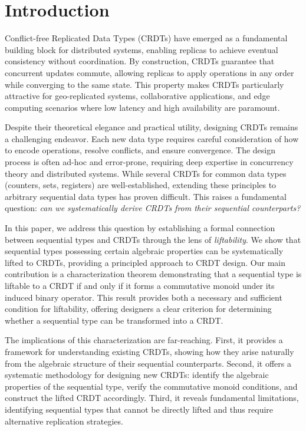 \section{Introduction}\label{sec:introduction}

Conflict-free Replicated Data Types (CRDTs) have emerged as a fundamental building block for distributed systems, enabling replicas to achieve eventual consistency without coordination. By construction, CRDTs guarantee that concurrent updates commute, allowing replicas to apply operations in any order while converging to the same state. This property makes CRDTs particularly attractive for geo-replicated systems, collaborative applications, and edge computing scenarios where low latency and high availability are paramount.

Despite their theoretical elegance and practical utility, designing CRDTs remains a challenging endeavor. Each new data type requires careful consideration of how to encode operations, resolve conflicts, and ensure convergence. The design process is often ad-hoc and error-prone, requiring deep expertise in concurrency theory and distributed systems. While several CRDTs for common data types (counters, sets, registers) are well-established, extending these principles to arbitrary sequential data types has proven difficult. This raises a fundamental question: \emph{can we systematically derive CRDTs from their sequential counterparts?}

In this paper, we address this question by establishing a formal connection between sequential types and CRDTs through the lens of \emph{liftability}. We show that sequential types possessing certain algebraic properties can be systematically lifted to CRDTs, providing a principled approach to CRDT design. Our main contribution is a characterization theorem demonstrating that a sequential type is liftable to a CRDT if and only if it forms a commutative monoid under its induced binary operator. This result provides both a necessary and sufficient condition for liftability, offering designers a clear criterion for determining whether a sequential type can be transformed into a CRDT.

The implications of this characterization are far-reaching. First, it provides a framework for understanding existing CRDTs, showing how they arise naturally from the algebraic structure of their sequential counterparts. Second, it offers a systematic methodology for designing new CRDTs: identify the algebraic properties of the sequential type, verify the commutative monoid conditions, and construct the lifted CRDT accordingly. Third, it reveals fundamental limitations, identifying sequential types that cannot be directly lifted and thus require alternative replication strategies.

